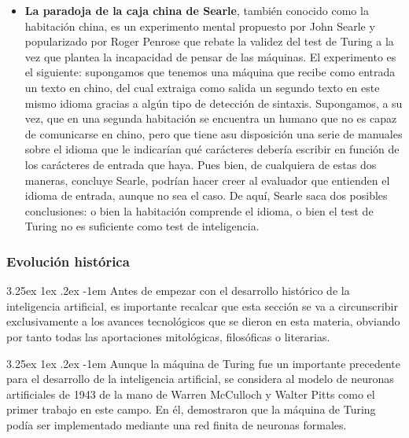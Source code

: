 \documentclass{article}
\makeatletter
\renewcommand\paragraph{\@startsection{paragraph}{5}{\z@}%
      {3.25ex \@plus1ex \@minus.2ex}%
      {-1em}%
      {\normalfont\normalsize\bfseries}}
\makeatother
\begin{document}
\begin{itemize}
        \item \textbf{La paradoja de la caja china de Searle}, también conocido como la habitación china, es un experimento mental propuesto por John Searle y popularizado por Roger Penrose que rebate la validez del test de Turing a la vez que plantea la incapacidad de pensar de las máquinas. El experimento es el siguiente: supongamos que tenemos una máquina que recibe como entrada un texto en chino, del cual extraiga como salida un segundo texto en este mismo idioma gracias a algún tipo de detección de sintaxis. Supongamos, a su vez, que en una segunda habitación se encuentra un humano que no es capaz de comunicarse en chino, pero que tiene asu disposición una serie de manuales sobre el idioma que le indicarían qué carácteres debería escribir en función de los carácteres de entrada que haya. Pues bien, de cualquiera de estas dos maneras, concluye Searle, podrían hacer creer al evaluador que entienden el idioma de entrada, aunque no sea el caso. De aquí, Searle saca dos posibles conclusiones: o bien la habitación comprende el idioma, o bien el test de Turing no es suficiente como test de inteligencia.
        
    \end{itemize}
    
            \subsubsection{Evolución histórica}
    
    \paragraph{}
    Antes de empezar con el desarrollo histórico de la inteligencia artificial, es importante recalcar que esta sección se va a circunscribir exclusivamente a los avances tecnológicos que se dieron en esta materia, obviando por tanto todas las aportaciones mitológicas\cite{automatasHefeso}, filosóficas \cite{filosofiaIA}o literarias\cite{frankenstein}\cite{yoRobot}.
    
    \paragraph{}
    Aunque la máquina de Turing\cite{maquinaTuring} fue un importante precedente para el desarrollo de la inteligencia artificial, se considera al modelo de neuronas artificiales de 1943 de la mano de Warren McCulloch y Walter Pitts\cite{mcculloch1943} como el primer trabajo en este campo. En él, demostraron que la máquina de Turing podía ser implementado mediante una red finita de neuronas formales.
    
\end{document}
